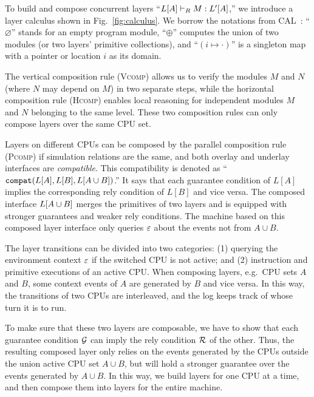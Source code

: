 \begin{figure*}
\begin{minipage}{1\textwidth}
\end{minipage}
    \caption{The fine-grained layer calculus in the concurrent setting.}
    \label{fig:calculus}
\end{figure*}

To build and compose   concurrent layers ``$\ltyp{\PLayer{L}{A}{\oracle_C}}{R}{M}{\PLayer{L'}{A}{\oracle_C'}}$,''
we introduce a  layer calculus shown in
Fig.~\ref{fig:calculus}. We borrow the notations
from CAL~\cite{deepspec}: ``$\varnothing$'' stands for an empty program module, ``$\oplus$'' computes the union of two modules (or two layers' primitive collections), and
``$(i\mapsto \cdot)$'' is a singleton map with a pointer or location $i$ as its domain.

The vertical composition rule (\textsc{Vcomp}) allows us
to verify the modules $M$ and $N$ (where $N$ may depend on $M$)
in two separate steps, while the horizontal composition rule
(\textsc{Hcomp}) enables local reasoning for independent
modules $M$ and $N$ belonging to the same level. These two composition rules can only compose layers over the same  CPU set.

Layers on different CPUs can be composed
by the parallel composition rule (\textsc{Pcomp}) if
 simulation relations are the same, and
 both overlay and underlay interfaces are \emph{compatible}.
 This compatibility is denoted as ``$\Compose{\PLayer{L}{A}{}}{\PLayer{L}{B}{}}{\PLayer{L}{A\cup B}{}}$.''
It says that each guarantee condition of $L[A]$ implies the corresponding rely condition of  $L[B]$ and vice versa. The composed interface
$\PLayer{L}{A\cup B}{}$
merges the primitives of two layers and is equipped with
stronger guarantees and weaker rely conditions.
The machine based on this composed layer interface only queries  $\oracle$
about the events not from $A\cup B$.

The layer transitions
can be divided into two categories:
(1) querying the environment context $\oracle$  if the switched CPU is not active;
and (2) instruction and primitive executions
of an active CPU.
When composing layers, e.g.\, CPU sets $A$ and $B$,
some context events of $A$ are generated
by $B$ and vice versa.
In this way, the transitions of two CPUs
are interleaved, and the log keeps track of whose turn it is to run.

To make sure that these two layers are composable,
we have to show that each guarantee condition $\Guard$
can imply the rely condition $\Rely$ of the other.
Thus, the resulting composed layer only relies on the events
generated by the CPUs outside the union
active CPU set  $A\cup B$, but will hold
a stronger guarantee over the events generated by $A\cup B$.
In this way, we build layers for one CPU at a time, and then
compose them into layers for the entire machine.

